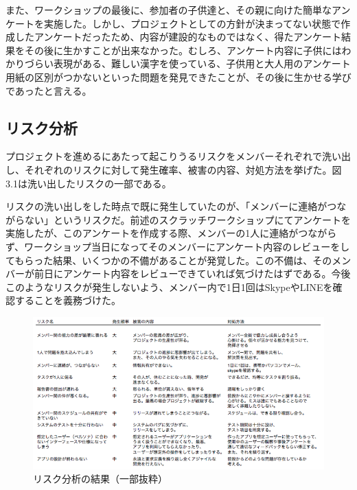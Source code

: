 \documentclass[openany,11pt,papersize]{jsbook}
\begin{document}
\par また、ワークショップの最後に、参加者の子供達と、その親に向けた簡単なアンケートを実施した。しかし、プロジェクトとしての方針が決まってない状態で作成したアンケートだったため、内容が建設的なものではなく、得たアンケート結果をその後に生かすことが出来なかった。むしろ、アンケート内容に子供にはわかりづらい表現がある、難しい漢字を使っている、子供用と大人用のアンケート用紙の区別がつかないといった問題を発見できたことが、その後に生かせる学びであったと言える。


\subsection{リスク分析}
\par プロジェクトを進めるにあたって起こりうるリスクをメンバーそれぞれで洗い出し、それぞれのリスクに対して発生確率、被害の内容、対処方法を挙げた。図3.1は洗い出したリスクの一部である。

\par リスクの洗い出しをした時点で既に発生していたのが、「メンバーに連絡がつながらない」というリスクだ。前述のスクラッチワークショップにてアンケートを実施したが、このアンケートを作成する際、メンバーの1人に連絡がつながらず、ワークショップ当日になってそのメンバーにアンケート内容のレビューをしてもらった結果、いくつかの不備があることが発覚した。この不備は、そのメンバーが前日にアンケート内容をレビューできていれば気づけたはずである。今後このようなリスクが発生しないよう、メンバー内で1日1回はSkypeやLINEを確認することを義務づけた。

\begin{figure}[H]
\begin{center}
\includegraphics[width=14cm, bb=0 0 753 394]{img/RiskManagement.png}
\end{center}
\caption{リスク分析の結果（一部抜粋）}
\end{figure}
\end{document}

